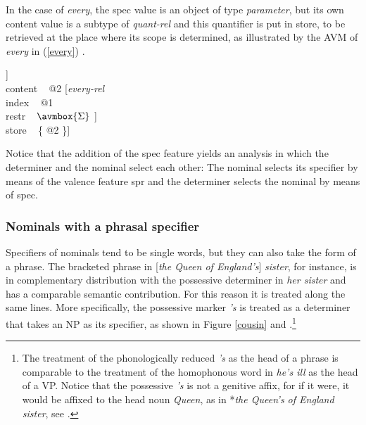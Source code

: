 \documentclass[output=paper]{langsci/langscibook}
\begin{document}
\noindent
In the case of {\it every}, the {\sc spec} value is an object of 
type {\it parameter}, but its own {\sc content} value is a subtype of 
{\it quant-rel} and this quantifier is put in store, to be retrieved 
at the place where its scope is determined, as illustrated by the AVM
of {\it every\/} in (\ref{every}) \citep[204]{GS00}.  

\begin{exe} 
\ex\label{every} 
\begin{avm}
[cat|head [{\it det\/}               \\
           spec [{\it parameter\/}   \\
                 index ~ @1          \\
                 restr ~ $\avmbox{\Sigma}$ ]] \\
 content ~ @2 [{\it every-rel\/}     \\
               index ~ @1            \\
               restr ~ $\avmbox{\Sigma}$ ] \\
 store ~ \{ @2 \}]
\end{avm}
\end{exe}

\noindent 
Notice that the addition of the {\sc spec} feature yields an analysis in which the determiner 
and the nominal select each other: The nominal selects 
its specifier by means of the valence feature {\sc spr} and the determiner selects the nominal 
by means of {\sc spec}.  


\subsubsection{Nominals with a phrasal specifier} 


Specifiers of nominals tend to be single words, but they can also take the form 
of a phrase. The bracketed phrase in [{\it the Queen of England's\/}] {\it sister},
for instance, is in complementary distribution with the possessive
determiner in {\it her sister\/} and has a comparable semantic contribution.   
For this reason it is treated along the same lines. More specifically, the 
possessive marker {\it 's\/} is treated as a determiner that takes an NP as its specifier, 
as shown in Figure \ref{cousin} \citep[51--54]{PS94} and \citep[193]{GS00}.\footnote{The treatment 
of the phonologically reduced {\it 's} as the head of a phrase is comparable to 
the treatment of the homophonous word in {\it he's ill\/} as the head of a VP.
Notice that the possessive {\it 's\/} is not a genitive affix, for if it were, it 
would be affixed to the head noun {\it Queen}, as in *{\it the Queen's of England sister\/}, see  
\citet[199]{SagWasow03}.}
\end{document}
